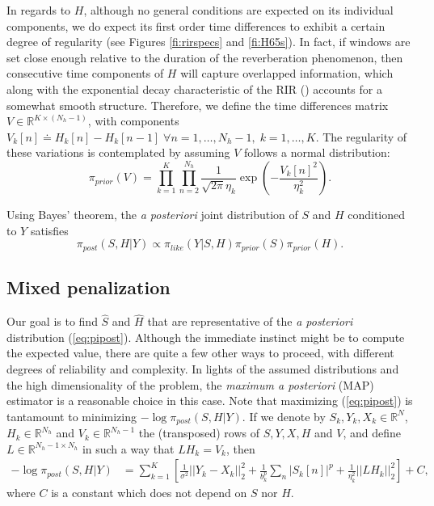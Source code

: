 \documentclass[12pt]{article}
\begin{document}
In regards to $H$, although no general conditions are expected on its individual components, we do expect its first order time differences to exhibit a certain degree of regularity (see Figures \ref{fi:rirspecs} and \ref{fi:H65s}). In fact, if windows are set close enough relative to the duration of the reverberation phenomenon, then consecutive time components of $H$ will capture overlapped information, which along with the exponential decay characteristic of the RIR (\cite{ratnam2003blind}) accounts for a somewhat smooth structure. Therefore, we define the time differences matrix $V\in\mathbb{R}^{K\times(N_h-1)}$, with components $V_k[n] \doteq H_k[n]-H_k\left[n-1\right]\;\forall n=1,\ldots, N_h-1,\;k=1,\ldots, K$. The regularity of these variations is contemplated by  assuming $V$ follows a normal distribution:
%
\begin{equation}
\pi_{prior}(V) =  \prod_{k=1}^K \prod_{n=2}^{N_h} \frac{1}{\sqrt{2\pi}\eta_k }\exp \left(-\frac{V_k[n]^2}{\eta_k^2}\right). \nonumber
\end{equation}

Using Bayes' theorem, the \emph{a posteriori} joint distribution of $S$ and $H$ conditioned to $Y$ satisfies
%
\begin{equation} \label{eq:pipost}
\pi_{post}(S,H|Y)  \propto \pi_{like}(Y|S,H)\pi_{prior}(S)\pi_{prior}(H).
\end{equation}



\subsection{Mixed penalization}

Our goal is to find $\hat{S}$ and $\hat{H}$ that are representative of the \emph{a posteriori} distribution (\ref{eq:pipost}). Although the immediate instinct might be to compute the expected value, there are quite a few other ways to proceed, with different degrees of reliability and complexity. In lights of the assumed distributions and the high dimensionality of the problem, the \emph{maximum a posteriori} (MAP) estimator is a reasonable choice in this case. Note that maximizing (\ref{eq:pipost}) is tantamount to minimizing $-\log \pi_{post}(S,H|Y)$. If we denote by  $S_k,Y_k, X_k \in\mathbb{R}^N $, $H_k\in \mathbb{R}^{N_h}$ and $V_k\in \mathbb{R}^{N_h-1}$ the (transposed) rows of $S,Y, X, H$ and $V$, and define $L\in\mathbb{R}^{N_h-1\times N_h}$ in such a way that $LH_k = V_k$, then
%
\small
\begin{align} \nonumber
-\log \pi_{post}(S,H|Y)
& = \sum_{k=1}^{K}\left[  \frac{1}{\sigma^2}||Y_k - X_k||_2^2  +\frac{1}{b_k^p}\sum_n|S_k[n]|^p + \frac{1}{\eta_k^2}||LH_k||_2^2 \right] +C\nonumber,
\end{align}
\normalsize
%
where $C$ is a constant which does not depend on $S$ nor $H$.
\end{document}
